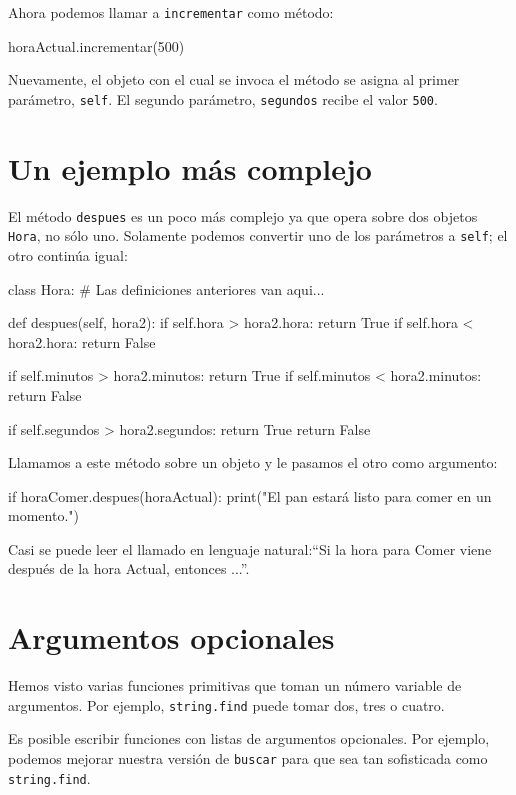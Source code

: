 Ahora podemos llamar a \texttt{incrementar} como método:
\begin{pythoncode}
horaActual.incrementar(500)
\end{pythoncode}

Nuevamente, el objeto con el cual se invoca el método se asigna al
primer parámetro, \texttt{self}. El segundo parámetro, \texttt{segundos}
recibe el valor \texttt{500}.

\section{Un ejemplo más complejo}

El método \texttt{despues} es un poco más complejo ya que opera sobre
dos objetos \texttt{Hora}, no sólo uno. Solamente podemos convertir
uno de los parámetros a \texttt{self}; el otro continúa igual:

\pagebreak

\begin{pythoncode}
class Hora:
  # Las definiciones anteriores van aqui...

  def despues(self, hora2):
    if self.hora > hora2.hora:
      return True
    if self.hora < hora2.hora:
      return False

    if self.minutos > hora2.minutos:
      return True
    if self.minutos < hora2.minutos:
      return False

    if self.segundos > hora2.segundos:
      return True
    return False
\end{pythoncode}
 Llamamos a este método sobre un objeto y le pasamos el otro como
argumento:
\begin{pythoncode}
if horaComer.despues(horaActual):
  print("El pan estará listo para comer en un momento.")
\end{pythoncode}

Casi se puede leer el llamado en lenguaje natural:``Si la hora para
Comer viene después de la hora Actual, entonces ...''.

\section{Argumentos opcionales}

Hemos visto varias funciones primitivas que toman un número variable
de argumentos. Por ejemplo, \texttt{string.find} puede tomar dos,
tres o cuatro.

Es posible escribir funciones con listas de argumentos opcionales.
Por ejemplo, podemos mejorar nuestra versión de \texttt{buscar} para
que sea tan sofisticada como \texttt{string.find}.


